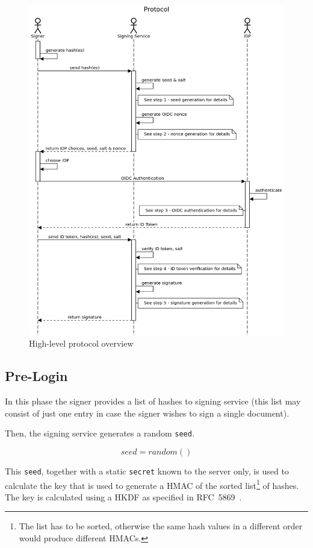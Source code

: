 \begin{figure}
    \begin{center}
        \includegraphics[scale=0.5]{images/protocol_signature_generation_high_level.png}
        \caption{High-level protocol overview}
        \label{fig:highlevelprotocoloverview}
    \end{center}
\end{figure}

\subsection{Pre-Login}\label{subsec:pre-login}
In this phase the signer provides a list of hashes to signing service
(this list may consist of just one entry in case the signer wishes to sign a single document).

Then, the signing service generates a random \texttt{seed}.

\[ seed = random() \]

This \texttt{seed}, together with a static \texttt{secret} known to the server only,
is used to calculate the key that is used to generate a \gls{HMAC}
of the sorted list\footnote{The list has to be sorted,
otherwise the same hash values in a different order would produce different \gls{HMAC}s.} of hashes.
The key is calculated using a \gls{HKDF} as specified in RFC~5869~\cite{rfc5869}.

